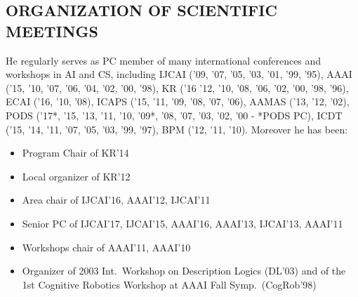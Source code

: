 \vspace{-2ex}
\subsection*{ORGANIZATION OF SCIENTIFIC MEETINGS}
\vspace{-2ex}
He regularly serves as PC member of many international conferences and workshops in AI and CS, including
IJCAI ('09, '07, '05, '03, '01, '99, '95), 
AAAI ('15, '10, '07, '06, '04, '02, '00, '98),
KR ('16 '12, '10, '08, '06, '02, '00, '98, '96), 
ECAI ('16, '10, '08), 
ICAPS ('15, '11, '09, '08, '07, '06), 
AAMAS ('13, '12, '02),
PODS ('17*, '15, '13, '11, '10, '09*, '08, '07, '03, '02, '00 - *PODS PC), 
ICDT ('15, '14, '11, '07, '05, '03, '99, '97),
BPM ('12, '11, '10).
Moreover he has been:
\begin{itemize}
\item Program Chair of KR'14
\item Local organizer of KR'12
\item Area chair of IJCAI'16, AAAI'12, IJCAI'11
\item Senior PC of IJCAI'17, IJCAI'15, AAAI'16, AAAI'13, IJCAI'13, AAAI'11
\item Workshops chair of AAAI'11, AAAI'10
\item Organizer of 2003 Int.\ Workshop on Description Logics (DL'03)
and of the 1st Cognitive Robotics Workshop at AAAI Fall Symp.\ (CogRob'98)
\end{itemize}

